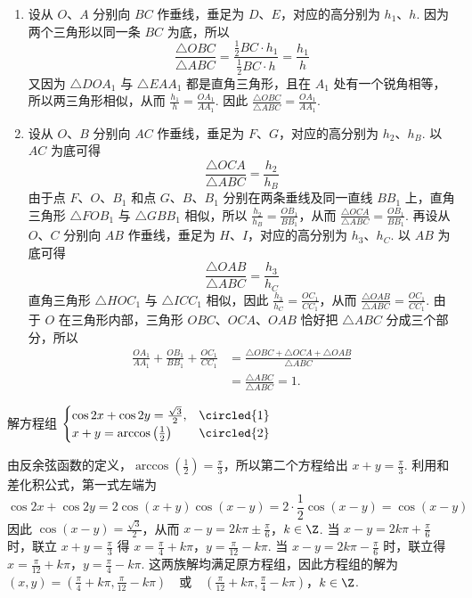 \begin{solution}
\begin{enumerate}
\item 设从 \(O\)、\(A\) 分别向 \(BC\) 作垂线，垂足为 \(D\)、\(E\)，对应的高分别为 \(h_1\)、\(h\). 因为两个三角形以同一条 \(BC\) 为底，所以
\[
\frac{\triangle OBC}{\triangle ABC}=\frac{\frac{1}{2}BC\cdot h_1}{\frac{1}{2}BC\cdot h}=\frac{h_1}{h}
\]
又因为 \(\triangle DOA_1\) 与 \(\triangle EAA_1\) 都是直角三角形，且在 \(A_1\) 处有一个锐角相等，所以两三角形相似，从而 \(\frac{h_1}{h}=\frac{OA_1}{AA_1}\). 因此 \(\frac{\triangle OBC}{\triangle ABC}=\frac{OA_1}{AA_1}\).

\item 设从 \(O\)、\(B\) 分别向 \(AC\) 作垂线，垂足为 \(F\)、\(G\)，对应的高分别为 \(h_2\)、\(h_B\). 以 \(AC\) 为底可得
\[
\frac{\triangle OCA}{\triangle ABC}=\frac{h_2}{h_B}
\]
由于点 \(F\)、\(O\)、\(B_1\) 和点 \(G\)、\(B\)、\(B_1\) 分别在两条垂线及同一直线 \(BB_1\) 上，直角三角形 \(\triangle FOB_1\) 与 \(\triangle GBB_1\) 相似，所以 \(\frac{h_2}{h_B}=\frac{OB_1}{BB_1}\)，从而 \(\frac{\triangle OCA}{\triangle ABC}=\frac{OB_1}{BB_1}\). 再设从 \(O\)、\(C\) 分别向 \(AB\) 作垂线，垂足为 \(H\)、\(I\)，对应的高分别为 \(h_3\)、\(h_C\). 以 \(AB\) 为底可得
\[
\frac{\triangle OAB}{\triangle ABC}=\frac{h_3}{h_C}
\]
直角三角形 \(\triangle HOC_1\) 与 \(\triangle ICC_1\) 相似，因此 \(\frac{h_3}{h_C}=\frac{OC_1}{CC_1}\)，从而 \(\frac{\triangle OAB}{\triangle ABC}=\frac{OC_1}{CC_1}\).
由于 \(O\) 在三角形内部，三角形 \(OBC\)、\(OCA\)、\(OAB\) 恰好把 \(\triangle ABC\) 分成三个部分，所以
\[
\begin{aligned}
\frac{OA_1}{AA_1}+\frac{OB_1}{BB_1}+\frac{OC_1}{CC_1}
&=\frac{\triangle OBC+\triangle OCA+\triangle OAB}{\triangle ABC}\\
&=\frac{\triangle ABC}{\triangle ABC}=1.
\end{aligned}
\]
\end{enumerate}
\end{solution}

\begin{problem}
解方程组 \(\begin{cases}
\cos 2x+\cos 2y=\frac{\sqrt{3}}{2}, &\circled{1}\\
x+y=\arccos\left( \frac{1}{2} \right) &\circled{2}
\end{cases}\)
\end{problem}

\begin{solution}
由反余弦函数的定义，\(\arccos\left(\frac{1}{2}\right)=\frac{\pi}{3}\)，所以第二个方程给出 \(x+y=\frac{\pi}{3}\). 利用和差化积公式，第一式左端为
\[
\cos 2x+\cos 2y=2\cos(x+y)\cos(x-y)=2\cdot\frac{1}{2}\cos(x-y)=\cos(x-y)
\]
因此 \(\cos(x-y)=\frac{\sqrt{3}}{2}\)，从而
\(x-y=2k\pi\pm\frac{\pi}{6}\)，\(k\in\Z\).
当 \(x-y=2k\pi+\frac{\pi}{6}\) 时，联立 \(x+y=\frac{\pi}{3}\) 得 \(x=\frac{\pi}{4}+k\pi\)，\(y=\frac{\pi}{12}-k\pi\). 当 \(x-y=2k\pi-\frac{\pi}{6}\) 时，联立得 \(x=\frac{\pi}{12}+k\pi\)，\(y=\frac{\pi}{4}-k\pi\). 这两族解均满足原方程组，因此方程组的解为
\(\left(x,y\right)=\left(\frac{\pi}{4}+k\pi,\frac{\pi}{12}-k\pi\right)\quad\text{或}\quad \left(\frac{\pi}{12}+k\pi,\frac{\pi}{4}-k\pi\right)\)，\(k\in\Z\).
\end{solution}

